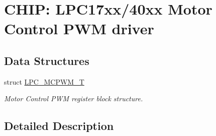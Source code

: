 \hypertarget{group__MCPWM__17XX__40XX}{\section{C\-H\-I\-P\-: L\-P\-C17xx/40xx Motor Control P\-W\-M driver}
\label{group__MCPWM__17XX__40XX}
}
\subsection*{Data Structures}
\begin{DoxyCompactItemize}
\item 
struct \hyperlink{structLPC__MCPWM__T}{L\-P\-C\-\_\-\-M\-C\-P\-W\-M\-\_\-\-T}
\begin{DoxyCompactList}\small\item\em Motor Control P\-W\-M register block structure. \end{DoxyCompactList}\end{DoxyCompactItemize}


\subsection{Detailed Description}
